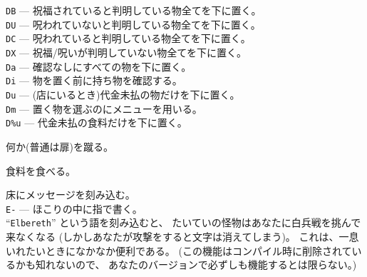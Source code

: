 {\tt DB}  --- 祝福されていると判明している物全てを下に置く。\\
{\tt DU}  --- 呪われていないと判明している物全てを下に置く。\\
{\tt DC}  --- 呪われていると判明している物全てを下に置く。\\
{\tt DX}  --- 祝福/呪いが判明していない物全てを下に置く。\\
{\tt Da}  --- 確認なしにすべての物を下に置く。\\
{\tt Di}  --- 物を置く前に持ち物を確認する。\\
{\tt Du}  --- (店にいるとき)代金未払の物だけを下に置く。\\
{\tt Dm}  --- 置く物を選ぶのにメニューを用いる。\\
{\tt D\%u} --- 代金未払の食料だけを下に置く。
\item[\tb{\^{}D}]
何か(普通は扉)を蹴る。
\item[\tb{e}]
食料を食べる。
\item[\tb{E}]
床にメッセージを刻み込む。\\
{\tt E-} --- ほこりの中に指で書く。\\
``{\tt Elbereth}'' という語を刻み込むと、
たいていの怪物はあなたに白兵戦を挑んで来なくなる
(しかしあなたが攻撃をすると文字は消えてしまう)。
これは、一息いれたいときになかなか便利である。
(この機能はコンパイル時に削除されているかも知れないので、
あなたのバージョンで必ずしも機能するとは限らない。)
\item[\tb{f}]
